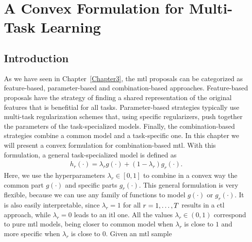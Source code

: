 
\chapter{A Convex Formulation for Multi-Task Learning} %
\label{Chapter4}

{\bf \small{

}}

\section{Introduction}
As we have seen in Chapter~\ref{Chapter3}, the \acrfull{mtl} proposals can be categorized as feature-based, parameter-based and combination-based approaches. Feature-based proposals have the strategy of finding a shared representation of the original features that is benefitial for all tasks. Parameter-based strategies typically use multi-task regularization schemes that, using specific regularizers, push together the parameters of the task-specialized models.
Finally, the combination-based strategies combine a common model and a task-specific one. 
%
In this chapter we will present a convex formulation for combination-based \acrshort{mtl}. With this formulation, a general task-specialized model is defined as
\begin{equation}
    \label{eq:convexmtl_general}
    \begin{aligned}
        h_r(\cdot)
       = \lambda_r g(\cdot) + (1 - \lambda_r) g_r(\cdot) .
    \end{aligned}    
\end{equation}
Here, we use the hyperparameters $\lambda_r \in [0, 1]$ to combine in a convex way the common part $g(\cdot)$ and specific parts $g_r(\cdot)$. This general formulation is very flexible, because we can use any family of functions to model $g(\cdot)$ or $g_r(\cdot)$. It is also easily interpretable, since $\lambda_r=1$ for all $r=1, \ldots, T$ results in a \acrfull{ctl} approach, while $\lambda_r=0$ leads to an \acrfull{itl} one. All the values $\lambda_r \in (0, 1)$ correspond to pure \acrshort{mtl} models, being closer to common model when $\lambda_r$ is close to $1$ and more specific when $\lambda_r$ is close to $0$.
%
Given an \acrshort{mtl} sample 
